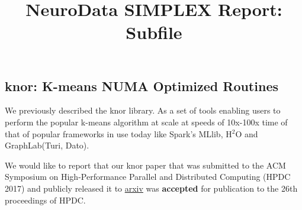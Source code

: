 \documentclass[simplex.tex]{subfiles}
\title{NeuroData SIMPLEX Report: Subfile}
\begin{document}

\subsection{knor: K-means NUMA Optimized Routines}

We previously described the \textsf{knor} library. As a set of tools enabling
users to perform the popular k-means algorithm at scale at speeds of 10x-100x
time of that of popular frameworks in use today like Spark's MLlib, H$^2$O
and GraphLab(Turi, Dato).

We would like to report that our \textsf{knor} paper that was submitted
to the ACM Symposium on High-Performance Parallel and Distributed Computing (HPDC 2017)
and publicly released it to \href{https://arxiv.org/abs/1606.08905}{arxiv}
was \textbf{accepted} for publication to the 26th proceedings of HPDC.
\end{document}
